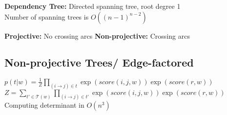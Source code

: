 \textbf{Dependency Tree:} Directed spanning tree, root degree 1\\
Number of spanning trees is $O((n-1)^{n-2})$\\
\begin{comment}
	The relations between words, indicated by arches, are directed and labeled, e.g. noun-modifier, determiner, object, etc.\\
	Without further non-terminals, CFG does not provide information about syntactic heads. On the other hand, the dependency tree of it will not provide information about constituency structure.
	Conversion from constituency tree to dependency tree is mostly done using heuristics. A triangle tree structure, A->B, A->C can be translated to two versions of a dependency structure, B->C or C->B. Often only one makes grammatically sense, f.e. B = red, C = dog, Noun typically must be the head of the NounPhrase.\\
\end{comment} 

\textbf{Projective:} No crossing arcs 
\textbf{Non-projective:} Crossing arcs \\
\begin{comment}
	Projective trees are closely related to constituency trees with heads, whereas non-projective trees are closely related to discontinous consituents.\\
	The CYK algorithm can be adapted to find projective dependency trees.
	Finding non-projective trees works best with drawing the arcs.\\
\end{comment} 

\subsection{Non-projective Trees/ Edge-factored}
$p(t|w) = \frac{1}{Z} \prod_{(i \rightarrow j) \in t} \exp(score(i,j,w)) \exp(score(r,w))$\\
$Z = \sum_{t' \in \mathcal{T}(w)} \prod_{(i \rightarrow j) \in t'} \exp(score(i,j,w)) \exp(score(r,w))$\\
Computing determinant in $O(n^3)$\\
\begin{comment}
	Number of spanning trees with root constraint are $(n-1)^{n-2}$, putting a naive approach for computing the normalizer into $O(n^n)$\\
	\textbf{Edge factor assumption:} The score factors over the edges in the tree \\
\end{comment} 


